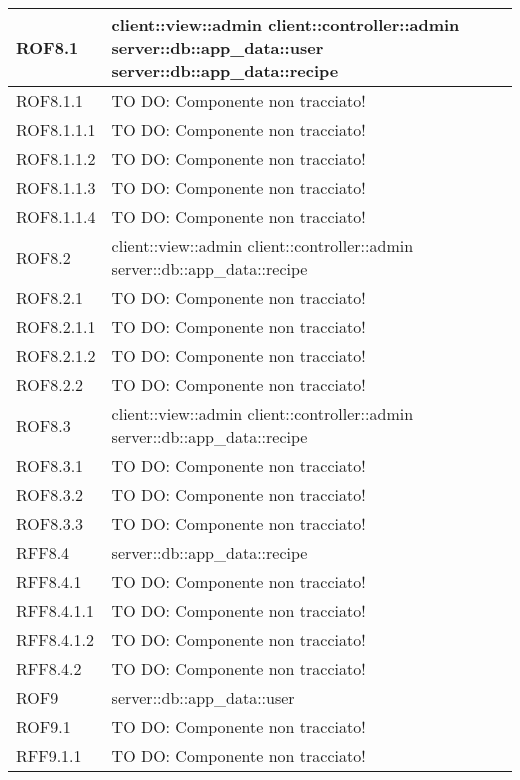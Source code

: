 \begin{center}
\begin{longtable}{| p{4cm} | p{8cm} |}
\hline
ROF8.1 & client::view::admin \newline client::controller::admin \newline server::db::app\_data::user \newline server::db::app\_data::recipe \\
\hline
ROF8.1.1 & TO DO: Componente non tracciato! \\
\hline
ROF8.1.1.1 & TO DO: Componente non tracciato! \\
\hline
ROF8.1.1.2 & TO DO: Componente non tracciato! \\
\hline
ROF8.1.1.3 & TO DO: Componente non tracciato! \\
\hline
ROF8.1.1.4 & TO DO: Componente non tracciato! \\
\hline
ROF8.2 & client::view::admin \newline client::controller::admin \newline server::db::app\_data::recipe \\
\hline
ROF8.2.1 & TO DO: Componente non tracciato! \\
\hline
ROF8.2.1.1 & TO DO: Componente non tracciato! \\
\hline
ROF8.2.1.2 & TO DO: Componente non tracciato! \\
\hline
ROF8.2.2 & TO DO: Componente non tracciato! \\
\hline
ROF8.3 & client::view::admin \newline client::controller::admin \newline server::db::app\_data::recipe \\
\hline
ROF8.3.1 & TO DO: Componente non tracciato! \\
\hline
ROF8.3.2 & TO DO: Componente non tracciato! \\
\hline
ROF8.3.3 & TO DO: Componente non tracciato! \\
\hline
RFF8.4 & server::db::app\_data::recipe \\
\hline
RFF8.4.1 & TO DO: Componente non tracciato! \\
\hline
RFF8.4.1.1 & TO DO: Componente non tracciato! \\
\hline
RFF8.4.1.2 & TO DO: Componente non tracciato! \\
\hline
RFF8.4.2 & TO DO: Componente non tracciato! \\
\hline
ROF9 & server::db::app\_data::user \\
\hline
ROF9.1 & TO DO: Componente non tracciato! \\
\hline
RFF9.1.1 & TO DO: Componente non tracciato! \\

\end{longtable}
\end{center}

